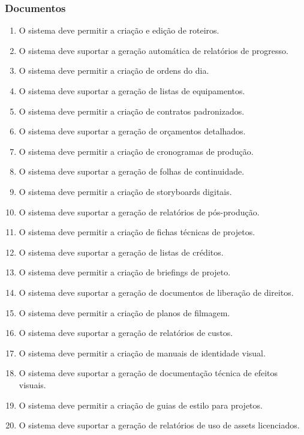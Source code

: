 \subsubsection{Documentos}
\begin{enumerate}
  \item O sistema deve permitir a criação e edição de roteiros.
  \item O sistema deve suportar a geração automática de relatórios de progresso.
  \item O sistema deve permitir a criação de ordens do dia.
  \item O sistema deve suportar a geração de listas de equipamentos.
  \item O sistema deve permitir a criação de contratos padronizados.
  \item O sistema deve suportar a geração de orçamentos detalhados.
  \item O sistema deve permitir a criação de cronogramas de produção.
  \item O sistema deve suportar a geração de folhas de continuidade.
  \item O sistema deve permitir a criação de storyboards digitais.
  \item O sistema deve suportar a geração de relatórios de pós-produção.
  \item O sistema deve permitir a criação de fichas técnicas de projetos.
  \item O sistema deve suportar a geração de listas de créditos.
  \item O sistema deve permitir a criação de briefings de projeto.
  \item O sistema deve suportar a geração de documentos de liberação de direitos.
  \item O sistema deve permitir a criação de planos de filmagem.
  \item O sistema deve suportar a geração de relatórios de custos.
  \item O sistema deve permitir a criação de manuais de identidade visual.
  \item O sistema deve suportar a geração de documentação técnica de efeitos visuais.
  \item O sistema deve permitir a criação de guias de estilo para projetos.
  \item O sistema deve suportar a geração de relatórios de uso de assets licenciados.
\end{enumerate}

